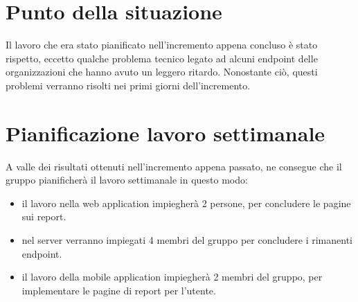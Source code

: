 \documentclass{article}
\begin{document}
\section{Punto della situazione}%
\label{sec:punto_della_situazione}
Il lavoro che era stato pianificato nell'incremento appena concluso è stato rispetto, eccetto qualche problema tecnico legato ad alcuni endpoint delle organizzazioni che hanno avuto un leggero ritardo. Nonostante ciò, questi problemi verranno risolti nei primi giorni dell'incremento.

\section{Pianificazione lavoro settimanale}%
\label{sec:pianificazione_lavoro_settimanale}
A valle dei risultati ottenuti nell'incremento appena passato, ne consegue che il gruppo pianificherà il lavoro settimanale in questo modo:
\begin{itemize}
  \item il lavoro nella web application impiegherà 2 persone, per concludere le pagine sui report.
  \item nel server verranno impiegati 4 membri del gruppo per concludere i rimanenti endpoint.
  \item il lavoro della mobile application impiegherà 2 membri del gruppo, per implementare le pagine di report per l'utente.
\end{itemize}
\end{document}
